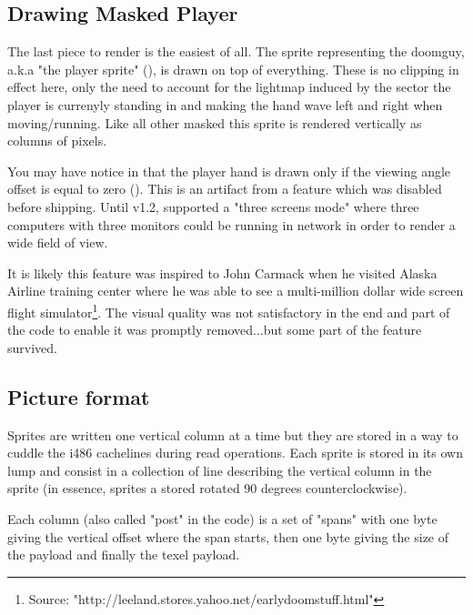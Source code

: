 \subsection{Drawing Masked Player}
The last piece to render is the easiest of all. The sprite representing the doomguy, a.k.a "the player sprite" (), is drawn on top of everything. These is no clipping in effect here, only the need to account for the lightmap induced by the sector the player is currenyly standing in and making the hand wave left and right when moving/running. Like all other masked this sprite is rendered vertically as columns of pixels.\\
\par
You may have notice in  that the player hand is drawn only if the viewing angle offset is equal to zero (). This is an artifact from a feature which was disabled before shipping. Until v1.2, \doom{} supported a "three screens mode" where three computers with three monitors could be running in network in order to render a wide field of view.\\
\par
{}
\par
It is likely this feature was inspired to John Carmack when he visited Alaska Airline training center where he was able to see a multi-million dollar wide screen flight simulator\footnote{Source: "http://leeland.stores.yahoo.net/earlydoomstuff.html"}. The visual quality was not satisfactory in the end and part of the code to enable it was promptly removed...but some part of the feature survived.\\
\par

\subsection{Picture format}
Sprites are written one vertical column at a time but they are stored in a way to cuddle the i486 cachelines during read operations. Each sprite is stored in its own lump and consist in a collection of line describing the vertical column in the sprite (in essence, sprites a stored rotated 90 degrees counterclockwise).\\
\par
Each column (also called "post" in the code) is a set of "spans" with one byte giving the vertical offset where the span starts, then one byte giving the size of the payload and finally the texel payload.
\pagebreak


